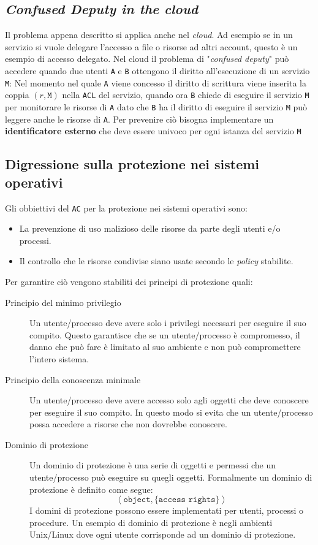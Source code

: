     \subsection{\textit{Confused Deputy in the cloud}}
        Il problema appena descritto si applica anche nel \textit{cloud}. Ad esempio se in un servizio si vuole delegare l'accesso a file o risorse ad altri account, questo è un esempio di accesso delegato. Nel cloud il problema di "\textit{confused deputy}" può accedere quando due utenti \texttt{A} e \texttt{B} ottengono il diritto all'esecuzione di un servizio \texttt{M}: Nel momento nel quale \texttt{A} viene concesso il diritto di scrittura viene inserita la coppia $(r,\texttt{M})$ nella \texttt{ACL} del servizio, quando ora \texttt{B} chiede di eseguire il servizio \texttt{M} per monitorare le risorse di \texttt{A} dato che \texttt{B} ha il diritto di eseguire il servizio \texttt{M} può leggere anche le risorse di \texttt{A}.\newline
        Per prevenire ciò bisogna implementare un \textbf{identificatore esterno} che deve essere univoco per ogni istanza del servizio \texttt{M}
    \subsection{Digressione sulla protezione nei sistemi operativi}
        Gli obbiettivi del \texttt{AC} per la protezione nei sistemi operativi sono:
        \begin{itemize}
            \item La prevenzione di uso malizioso delle risorse da parte degli utenti e/o processi.
            \item Il controllo che le risorse condivise siano usate secondo le \textit{policy} stabilite.
        \end{itemize}
        Per garantire ciò vengono stabiliti dei principi di protezione quali:
        \begin{description}
            \item[Principio del minimo privilegio] Un utente/processo deve avere solo i privilegi necessari per eseguire il suo compito. Questo garantisce che se un utente/processo è compromesso, il danno che può fare è limitato al suo ambiente e non può compromettere l'intero sistema.
            \item[Principio della conoscenza minimale] Un utente/processo deve avere accesso solo agli oggetti che deve conoscere per eseguire il suo compito. In questo modo si evita che un utente/processo possa accedere a risorse che non dovrebbe conoscere.
            \item[Dominio di protezione] Un dominio di protezione è una serie di oggetti e permessi che un utente/processo può eseguire su quegli oggetti. Formalmente un dominio di protezione è definito come segue: $$ \left< \texttt{object}, \{ \texttt{access rights} \} \right>$$ I domini di protezione possono essere implementati per utenti, processi o procedure. Un esempio di dominio di protezione è negli ambienti Unix/Linux dove ogni utente corrisponde ad un dominio di protezione.
        \end{description}
